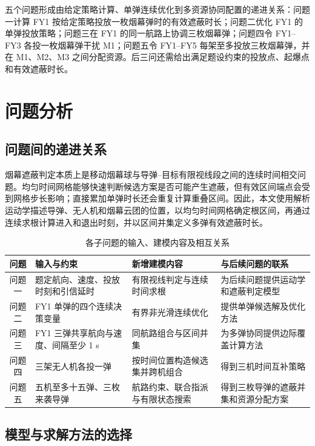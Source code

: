 \documentclass[UTF8,a4paper,12pt,fontset=windows]{ctexart}
\newcommand{\thead}[1]{{\bfseries\boldmath #1}}
\begin{document}
五个问题形成由给定策略计算、单弹连续优化到多资源协同配置的递进关系：问题一计算 FY1 按给定策略投放一枚烟幕弹时的有效遮蔽时长；问题二优化 FY1 的单弹投放策略；问题三在 FY1 的同一航路上协调三枚烟幕弹；问题四令 FY1--FY3 各投一枚烟幕弹干扰 M1；问题五令 FY1--FY5 每架至多投放三枚烟幕弹，并在 M1、M2、M3 之间分配资源。后三问还需给出满足题设约束的投放点、起爆点和有效遮蔽时长。

\section{问题分析}

\subsection{问题间的递进关系}

烟幕遮蔽判定本质上是移动烟幕球与导弹--目标有限视线段之间的连续时间相交问题。均匀时间网格能够快速判断候选方案是否可能产生遮蔽，但有效区间端点会受到网格步长影响；直接累加单弹时长还会重复计算重叠区间。因此，本文使用解析运动学描述导弹、无人机和烟幕云团的位置，以均匀时间网格确定根区间，再通过连续求根计算进入和退出时刻，并以区间并集定义多弹有效遮蔽时长。

\begin{table}[!htbp]
\centering
\caption{各子问题的输入、建模内容及相互关系}
\small
\begin{tabularx}{\textwidth}{cYYY}
\toprule
\thead{问题} & \thead{输入与约束} & \thead{新增建模内容} & \thead{与后续问题的联系}\\
\midrule
问题一 & 题定航向、速度、投放时刻和引信延时 & 有限视线判定与连续时间求根 & 为后续问题提供运动学和遮蔽判定模型\\
问题二 & FY1 单弹的四个连续决策变量 & 有界非光滑连续优化 & 提供单弹候选解及优化方法\\
问题三 & FY1 三弹共享航向与速度、间隔至少 1 s & 同航路组合与区间并集 & 为多弹协同提供边际覆盖计算方法\\
问题四 & 三架无人机各投一弹 & 按时间位置构造候选集并跨机组合 & 得到三机时间互补策略\\
问题五 & 五机至多十五弹、三枚来袭导弹 & 航路约束、联合指派与有限状态搜索 & 得到三枚导弹的遮蔽并集和资源分配方案\\
\bottomrule
\end{tabularx}
\end{table}

\subsection{模型与求解方法的选择}
\end{document}

